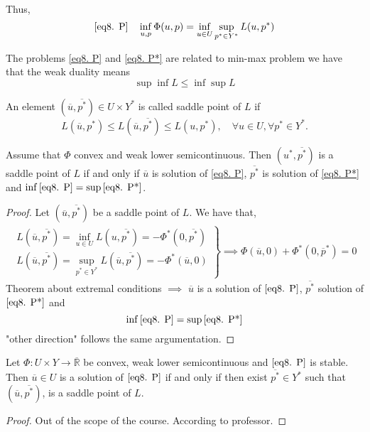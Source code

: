 Thus,
\begin{equation}
\eqref{eq8. P} \quad \inf_{u, p} \Phi(u, p) = \inf_{u \in U} \sup_{p^*\in Y^*} L(u, p^*)
\end{equation}

\begin{remark}
	The problems \eqref{eq8. P} and \eqref{eq8. P*} are related to min-max problem we have that the weak duality means 
	\[
		\sup \inf L \leq \inf \sup L
	\]
\end{remark}

\begin{definition}
	An element $(\overline{u}, \overline{p^*}) \in U\times Y^*$ is called saddle point of $L$ if 
	\[
		L(\overline{u}, p^*) \leq L(\overline{u}, \overline{p^*}) \leq L(u, p^*), \quad \forall u \in U, \forall p^* \in Y^*.
	\]
\end{definition}

\begin{theorem}
	Assume that $\Phi$ convex and weak lower semicontinuous. Then $(u^*, \overline{p^*})$ is a saddle point of $L$ if and only if $\overline{u}$ is solution of \eqref{eq8. P}, $\overline{p^*}$ is solution of \eqref{eq8. P*} and $\inf\eqref{eq8. P}=\sup\eqref{eq8. P*}$.
	\begin{proof}
		Let $(\overline{u}, \overline{p^*})$ be a saddle point of $L$. We have that, 
		\begin{align*}
		\left.
		\begin{array}{c}
		L(\overline{u}, \overline{p^*}) = \inf_{u \in U} L(u, \overline{p^*})=-\Phi^*(0, \overline{p^*}) \\
		L(\overline{u}, \overline{p^*}) = \sup_{p^* \in Y^*} L(\overline{u}, \overline{p^*})=-\Phi^*(\overline{u}, 0)
		\end{array}
		\right\rbrace \implies \Phi(\overline{u}, 0)+\Phi^*(0, \overline{p}^*)=0
		\end{align*}
		Theorem about extremal conditions $\implies$ $\overline{u}$ is a solution of $\eqref{eq8. P}$, $\overline{p^*}$ solution of $\eqref{eq8. P*}$ and 
		\[
			\inf\eqref{eq8. P} = \sup\eqref{eq8. P*}
		\]
		"other direction" follows the same argumentation.
	\end{proof}
\end{theorem}
\begin{theorem}
	Let $\Phi: U \times Y \rightarrow \overline{\mathbb{R}}$ be convex, weak lower semicontinuous and $\eqref{eq8. P}$ is stable. Then $\overline{u}\in U$ is a solution of $\eqref{eq8. P}$ if and only if then exist $\overline{p^*} \in Y^*$ such that $(\overline{u}, \overline{p^*})$, is a saddle point of $L$.
	\begin{proof}
		Out of the scope of the course. According to professor.
	\end{proof}
\end{theorem}
